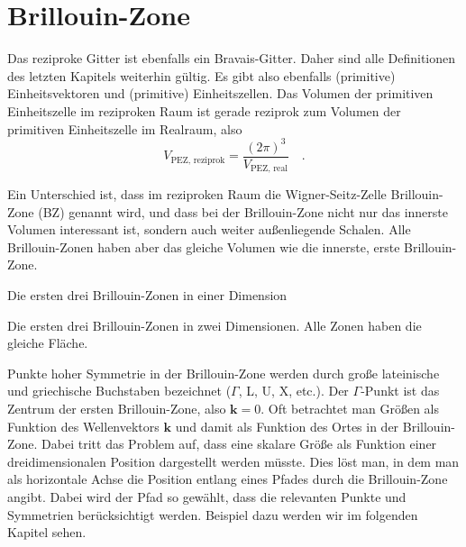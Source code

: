 \section{Brillouin-Zone}

Das reziproke Gitter ist ebenfalls ein Bravais-Gitter. Daher sind alle Definitionen des letzten Kapitels weiterhin gültig. Es gibt also ebenfalls (primitive) Einheitsvektoren und (primitive) Einheitszellen. Das Volumen der primitiven Einheitszelle im reziproken Raum ist gerade reziprok zum Volumen der primitiven Einheitszelle im Realraum, also
\begin{equation}
V_\text{PEZ, reziprok} = \frac{(2 \pi)^3}{V_\text{PEZ, real} }
\quad .
\end{equation}

Ein Unterschied ist, dass im reziproken Raum die Wigner-Seitz-Zelle Brillouin-Zone (BZ) genannt wird, und dass bei der Brillouin-Zone nicht nur das innerste Volumen interessant ist, sondern auch weiter außenliegende Schalen. Alle  Brillouin-Zonen haben aber das gleiche Volumen wie die innerste, erste  Brillouin-Zone.


\begin{marginfigure}

\caption{Die ersten drei Brillouin-Zonen in einer Dimension}
\end{marginfigure}

\begin{marginfigure}

\caption{Die ersten drei Brillouin-Zonen in zwei Dimensionen. Alle Zonen haben die gleiche Fläche.}
\end{marginfigure}

Punkte hoher Symmetrie in der Brillouin-Zone werden durch große lateinische und griechische Buchstaben bezeichnet ($\Gamma$, L, U, X, etc.). Der $\Gamma$-Punkt ist das Zentrum der ersten Brillouin-Zone, also $\mathbf{k} = 0$. Oft betrachtet man Größen als Funktion des Wellenvektors  $\mathbf{k} $ und damit als Funktion des Ortes in der Brillouin-Zone. Dabei tritt das Problem auf, dass eine skalare Größe als Funktion einer dreidimensionalen Position dargestellt werden müsste. Dies löst man, in dem man als horizontale Achse die Position entlang eines Pfades durch die Brillouin-Zone angibt. Dabei wird der Pfad so gewählt, dass die relevanten Punkte und Symmetrien berücksichtigt werden. Beispiel dazu werden wir im folgenden Kapitel sehen.



